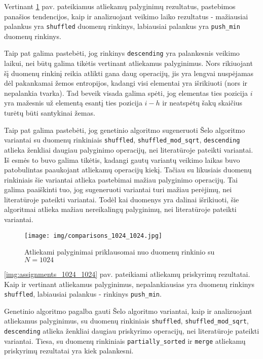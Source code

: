 \documentclass{VUMIFInfBakalaurinis}
\begin{document}
Vertinant \ref{img:comparisons_1024_1024} pav. pateikiamus atliekamų palyginimų rezultatus, pastebimos panašios tendencijos,
kaip ir analizuojant veikimo laiko rezultatus - mažiausiai palankus yra \verb|shuffled| duomenų rinkinys, labiausiai palankus yra \verb|push_min| duomenų rinkinys.

Taip pat galima pastebėti, jog rinkinys \verb|descending| yra palankesnis veikimo laikui, nei būtų galima tikėtis vertinant atliekamus palyginimus.
Nors rikiuojant šį duomenų rinkinį reikia atlikti gana daug operacijų, jis yra lengvai nuspėjamas dėl pakankamai žemos entropijos,
kadangi visi elementai yra išrikiuoti (nors ir nepalankia tvarka).
Tad beveik visada galima spėti, jog elementas ties pozicija $i$ yra mažesnis už elementą esantį ties pozicija $i - h$
ir neatspėtų šakų skaičius turėtų būti santykinai žemas.

Taip pat galima pastebėti, jog genetinio algoritmo sugeneruoti Šelo algoritmo variantai su duomenų rinkiniais \verb|shuffled|, \verb|shuffled_mod_sqrt|, \verb|descending|
atlieka ženkliai daugiau palyginimo operacijų, nei literatūroje pateikti variantai.
Iš esmės to buvo galima tikėtis, kadangi gautų variantų veikimo laikas buvo patobulintas paaukojant atliekamų operacijų kiekį.
Tačiau su likusiais duomenų rinkiniais šie variantai atlieka pastebimai mažiau palyginimo operacijų.
Tai galima paaiškinti tuo, jog sugeneruoti variantai turi mažiau perėjimų, nei literatūroje pateikti variantai.
Todėl kai duomenys yra dalinai išrikiuoti, šie algoritmai atlieka mažiau nereikalingų palyginimų, nei literatūroje pateikti variantai. 

\begin{figure}[H]
  \centering
  \texttt{[image: img/comparisons\_1024\_1024.jpg]}
  \caption{Atliekami palyginimai priklausomai nuo duomenų rinkinio su $N = 1024$}
  \label{img:comparisons_1024_1024}
\end{figure}

\pagebreak

\ref{img:assignments_1024_1024} pav. pateikiami atliekamų priskyrimų rezultatai.
Kaip ir vertinant atliekamus palyginimus, nepalankiausias yra duomenų rinkinys \verb|shuffled|, labiausiai palankus - rinkinys \verb|push_min|.

Genetinio algoritmo pagalba gauti Šelo algoritmo variantai, kaip ir analizuojant atliekamus palyginimus,
su duomenų rinkiniais \verb|shuffled|, \verb|shuffled_mod_sqrt|, \verb|descending| atlieka ženkliai daugiau priskyrimo operacijų, nei literatūroje pateikti variantai.
Tiesa, su duomenų rinkiniais \verb|partially_sorted| ir \verb|merge| atliekamų priskyrimų rezultatai yra kiek palankesni.
\end{document}

